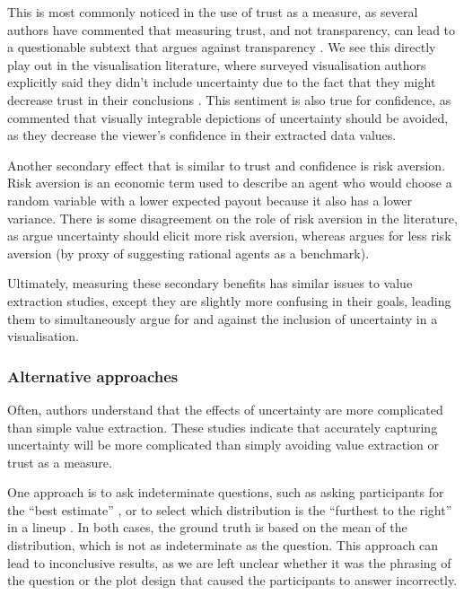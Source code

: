 \documentclass[]{ar-1col-S2O}
\begin{document}
This is most commonly noticed in the use of trust as a measure, as
several authors have commented that measuring trust, and not
transparency, can lead to a questionable subtext that argues against
transparency \citep{Spiegelhalter2017, ONeill2018}. We see this directly
play out in the visualisation literature, where surveyed visualisation
authors explicitly said they didn't include uncertainty due to the fact
that they might decrease trust in their conclusions
\citep{Hullman2020a}. This sentiment is also true for confidence, as
\citet{Blenkinsop2000} commented that visually integrable depictions of
uncertainty should be avoided, as they decrease the viewer's confidence
in their extracted data values.

Another secondary effect that is similar to trust and confidence is risk
aversion. Risk aversion is an economic term used to describe an agent
who would choose a random variable with a lower expected payout because
it also has a lower variance. There is some disagreement on the role of
risk aversion in the literature, as \citet{Hullman2019} argue
uncertainty should elicit more risk aversion, whereas
\citet{wu2023rational} argues for less risk aversion (by proxy of
suggesting rational agents as a benchmark).

Ultimately, measuring these secondary benefits has similar issues to
value extraction studies, except they are slightly more confusing in
their goals, leading them to simultaneously argue for and against the
inclusion of uncertainty in a visualisation.

\subsubsection{Alternative approaches}\label{alternative-approaches}

Often, authors understand that the effects of uncertainty are more
complicated than simple value extraction. These studies indicate that
accurately capturing uncertainty will be more complicated than simply
avoiding value extraction or trust as a measure.

One approach is to ask indeterminate questions, such as asking
participants for the ``best estimate'' \citep{Ibrekk1987}, or to select
which distribution is the ``furthest to the right'' in a lineup
\citep{Hofmann2012}. In both cases, the ground truth is based on the
mean of the distribution, which is not as indeterminate as the question.
This approach can lead to inconclusive results, as we are left unclear
whether it was the phrasing of the question or the plot design that
caused the participants to answer incorrectly.
\end{document}

